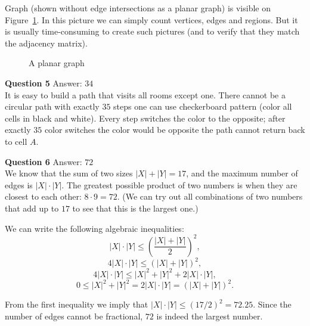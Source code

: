 \documentclass[jou]{apa6}
\begin{document}
Graph (shown without edge intersections as a planar graph) is visible 
on Figure~\ref{fig:question4-graph}. In this picture we can simply count 
vertices, edges and regions. But it is usually time-consuming to 
create such pictures (and to verify that they match the adjacency matrix).

\begin{figure}[!htb]
\caption{\label{fig:question4-graph} A planar graph}
\end{figure}


\vspace{10pt}
{\bf Question 5} Answer: $34$\\
It is easy to build a path that visits all rooms except one. 
There cannot be a circular path with exactly $35$ steps \textendash{}
one can use checkerboard pattern (color all cells in black and white). 
Every step switches the color to the opposite; after exactly $35$ color switches
the color would be opposite \textendash{} the path cannot return back to cell $A$.


\vspace{10pt}
{\bf Question 6} Answer: $72$\\
We know that the sum of two sizes $|X| + |Y| = 17$, 
and the maximum number of edges is $|X| \cdot |Y|$. 
The greatest possible product of two numbers is
when they are closest to each other: 
$8 \cdot 9 = 72$. (We can try out all combinations of two numbers
that add up to $17$ to see that this is the largest one.)

We can write the following algebraic inequalities: 
$$|X| \cdot |Y| \leq \left( \frac{|X| + |Y|}{2} \right)^2,$$
$$4 |X| \cdot |Y| \leq \left( |X| + |Y| \right)^2,$$
$$4 |X| \cdot |Y| \leq |X|^2 + |Y|^2 + 2 |X| \cdot |Y|,$$
$$0 \leq |X|^2 + |Y|^2 = 2 |X| \cdot |Y| = (|X| + |Y|)^2.$$

From the first inequality we imply that $|X| \cdot |Y| \leq (17/2)^2 = 72.25$. 
Since the number of edges cannot be fractional, $72$ is indeed the largest number.
\end{document}
